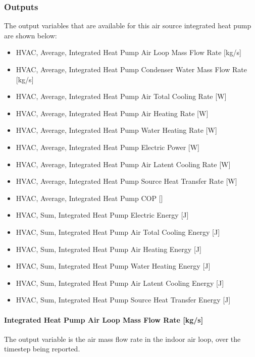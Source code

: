 \subsubsection{Outputs}\label{outputs-011}

The output variables that are available for this air source integrated heat pump are shown below:

\begin{itemize}
\item
  HVAC, Average, Integrated Heat Pump Air Loop Mass Flow Rate {[}kg/s{]}
\item
  HVAC, Average, Integrated Heat Pump Condenser Water Mass Flow Rate {[}kg/s{]}
\item
  HVAC, Average, Integrated Heat Pump Air Total Cooling Rate {[}W{]}
\item
  HVAC, Average, Integrated Heat Pump Air Heating Rate {[}W{]}
\item
  HVAC, Average, Integrated Heat Pump Water Heating Rate {[}W{]}
\item
  HVAC, Average, Integrated Heat Pump Electric Power {[}W{]}
\item
  HVAC, Average, Integrated Heat Pump Air Latent Cooling Rate {[}W{]}
\item
  HVAC, Average, Integrated Heat Pump Source Heat Transfer Rate {[}W{]}
 \item
  HVAC, Average, Integrated Heat Pump COP {[}{]}
 \item
  HVAC, Sum, Integrated Heat Pump Electric Energy {[}J{]}
 \item
  HVAC, Sum, Integrated Heat Pump Air Total Cooling Energy {[}J{]}
  \item
  HVAC, Sum, Integrated Heat Pump Air Heating Energy {[}J{]}
\item
  HVAC, Sum, Integrated Heat Pump Water Heating Energy {[}J{]}
 \item
  HVAC, Sum, Integrated Heat Pump Air Latent Cooling Energy {[}J{]}
 \item
  HVAC, Sum, Integrated Heat Pump Source Heat Transfer Energy {[}J{]}

\end{itemize}

\paragraph{Integrated Heat Pump Air Loop Mass Flow Rate {[}kg/s{]}}\label{Out-Air-Loop-Flow-Rate-ASIHP}
The output variable is the air mass flow rate in the indoor air loop, over the timestep being reported. 

